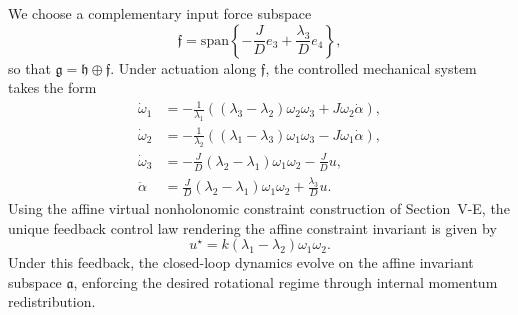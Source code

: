 \documentclass[letterpaper, 10 pt, conference]{ieeeconf}
\begin{document}
We choose a complementary input force subspace
\[
\mathfrak{f}
=
\mathrm{span}
\left\{
-\frac{J}{D}e_{3} + \frac{\lambda_{3}}{D}e_{4}
\right\},
\]
so that $\mathfrak{g} = \mathfrak{h} \oplus \mathfrak{f}$. Under actuation along $\mathfrak{f}$, the controlled mechanical system takes the form
\begin{equation*}
\begin{split}
\dot{\omega}_{1} & = -\frac{1}{\lambda_{1}}
\left( (\lambda_{3}-\lambda_{2})\omega_{2}\omega_{3} + J \omega_{2}\dot{\alpha} \right), \\
\dot{\omega}_{2} & = -\frac{1}{\lambda_{2}}
\left( (\lambda_{1}-\lambda_{3})\omega_{1}\omega_{3} - J \omega_{1}\dot{\alpha} \right), \\
\dot{\omega}_{3} & = -\frac{J}{D} (\lambda_{2}-\lambda_{1})\omega_{1}\omega_{2}
-\frac{J}{D}u, \\
\ddot{\alpha} & = \frac{J}{D} (\lambda_{2}-\lambda_{1})\omega_{1}\omega_{2}
+\frac{\lambda_{3}}{D}u .
\end{split}
\end{equation*}
Using the affine virtual nonholonomic constraint construction of Section~V-E, the unique feedback control law rendering the affine constraint invariant is given by
\[
u^{\star} = k(\lambda_{1}-\lambda_{2})\omega_{1}\omega_{2}.
\]
Under this feedback, the closed-loop dynamics evolve on the affine invariant subspace $\mathfrak{a}$, enforcing the desired rotational regime through internal momentum redistribution.



\end{document}
